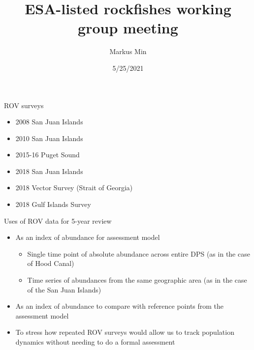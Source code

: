 \documentclass[
  ignorenonframetext,
]{beamer}
\title{ESA-listed rockfishes working group meeting}
\author{Markus Min}
\date{5/25/2021}
\providecommand{\tightlist}{%
  \setlength{\itemsep}{0pt}\setlength{\parskip}{0pt}}
\begin{document}
\frame{\titlepage}

\begin{frame}{ROV surveys}
\protect\hypertarget{rov-surveys}{}
\begin{itemize}
\tightlist
\item
  2008 San Juan Islands
\item
  2010 San Juan Islands
\item
  2015-16 Puget Sound
\item
  2018 San Juan Islands
\item
  2018 Vector Survey (Strait of Georgia)
\item
  2018 Gulf Islands Survey
\end{itemize}
\end{frame}

\begin{frame}{Uses of ROV data for 5-year review}
\protect\hypertarget{uses-of-rov-data-for-5-year-review}{}
\begin{itemize}
\tightlist
\item
  As an index of abundance for assessment model

  \begin{itemize}
  \tightlist
  \item
    Single time point of absolute abundance across entire DPS (as in the
    case of Hood Canal)
  \item
    Time series of abundances from the same geographic area (as in the
    case of the San Juan Islands)
  \end{itemize}
\item
  As an index of abundance to compare with reference points from the
  assessment model
\item
  To stress how repeated ROV surveys would allow us to track population
  dynamics without needing to do a formal assessment
\end{itemize}
\end{frame}
\end{document}
